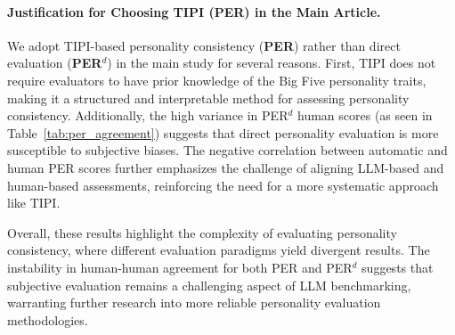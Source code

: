 \paragraph{Justification for Choosing TIPI (PER) in the Main Article.}  
We adopt TIPI-based personality consistency (\textbf{PER}) rather than direct evaluation (\textbf{PER}$^d$) in the main study for several reasons. First, TIPI does not require evaluators to have prior knowledge of the Big Five personality traits, making it a structured and interpretable method for assessing personality consistency. Additionally, the high variance in PER$^d$ human scores (as seen in Table~\ref{tab:per_agreement}) suggests that direct personality evaluation is more susceptible to subjective biases. The negative correlation between automatic and human PER scores further emphasizes the challenge of aligning LLM-based and human-based assessments, reinforcing the need for a more systematic approach like TIPI.

Overall, these results highlight the complexity of evaluating personality consistency, where different evaluation paradigms yield divergent results. The instability in human-human agreement for both PER and PER$^d$ suggests that subjective evaluation remains a challenging aspect of LLM benchmarking, warranting further research into more reliable personality evaluation methodologies.


